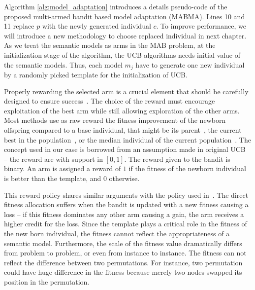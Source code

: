 Algorithm \ref{alg:model_adaptation} introduces a details pseudo-code of the proposed multi-armed bandit based model adaptation (MABMA). Lines 10 and 11 replace $p$ with the newly generated individual $c$. To improve performance, we will introduce a new methodology to choose replaced individual in next chapter. As we treat the semantic models as arms in the MAB problem, at the initialization stage of the algorithm, the UCB algorithms needs initial value of the semantic models. Thus, each model $m_j$ have to generate one new individual by a randomly picked template for the initialization of UCB.

Properly rewarding the selected arm is a crucial element that should be carefully designed to ensure success~\citep{fialho2010analyzing}. The choice of the reward must encourage exploitation of the best arm while still allowing exploration of the other arms. Most methods use as raw reward the fitness improvement of the newborn offspring compared to a base individual, that might be its parent~\citep{barbosa2000adaptive, fialho2008extreme, fialho2009analysis, lobo1997decision, tuson1998adapting}, the current best in the population~\citep{Davis:1989:AOP:93126.93146}, or the median individual of the current population~\citep{Julstrom:1995:YDM:645514.657934}. The concept used in our case is borrowed from an assumption made in original UCB~\citep{Auer2002} -- the reward are with support in $[0,1]$. The reward given to the bandit is binary. An arm is assigned a reward of $1$ if the fitness of the newborn individual is better than the template, and 0 otherwise. 

This reward policy shares similar arguments with the policy used in~\citep{DeRainville:2013:SCC:2463372.2463556}. The direct fitness allocation suffers when the bandit is updated with a new fitness causing a loss -- if this fitness dominates any other arm causing a gain, the arm receives a higher credit for the loss. Since the template plays a critical role in the fitness of the new born individual, the fitness cannot reflect the appropriateness of a semantic model. Furthermore, the scale of the fitness value dramatically differs from problem to problem, or even from instance to instance. The fitness can not reflect the difference between two permutations. For instance, two permutation could have huge difference in the fitness because merely two nodes swapped its position in the permutation.


